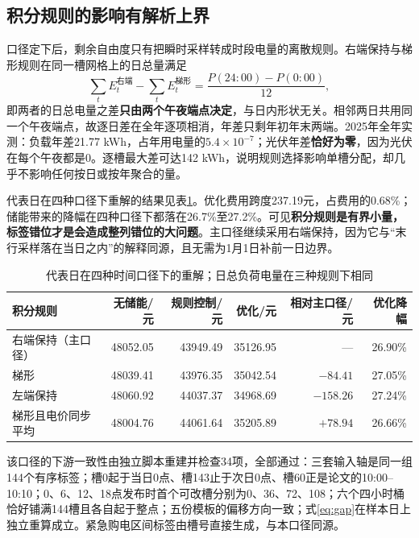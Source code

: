 \documentclass[UTF8,a4paper,zihao=-4,fontset=fandol]{ctexart}
\begin{document}
\subsection{积分规则的影响有解析上界}
口径定下后，剩余自由度只有把瞬时采样转成时段电量的离散规则。右端保持与梯形规则在同一槽网格上的日总量满足
\begin{equation}\label{eq:gap}
\sum_t E_t^{\text{右端}}-\sum_t E_t^{\text{梯形}}=\frac{P(24{:}00)-P(0{:}00)}{12},
\end{equation}
即两者的日总电量之差\textbf{只由两个午夜端点决定}，与日内形状无关。相邻两日共用同一个午夜端点，故逐日差在全年逐项相消，年差只剩年初年末两端。2025年全年实测：负载年差21.77 kWh，占年用电量的$5.4\times10^{-7}$；光伏年差\textbf{恰好为零}，因为光伏在每个午夜都是0。逐槽最大差可达142 kWh，说明规则选择影响单槽分配，却几乎不影响任何按日或按年聚合的量。

代表日在四种口径下重解的结果见表\ref{tab:time}。优化费用跨度237.19元，占费用的0.68\%；储能带来的降幅在四种口径下都落在26.7\%至27.2\%。可见\textbf{积分规则是有界小量，标签错位才是会造成整列错位的大问题}。主口径继续采用右端保持，因为它与“末行采样落在当日之内”的解释同源，且无需为1月1日补前一日边界。
\begin{table}[H]\centering\caption{代表日在四种时间口径下的重解；日总负荷电量在三种规则下相同}\label{tab:time}\small
\begin{tabular}{lrrrrr}\toprule
积分规则 & 无储能/元 & 规则控制/元 & 优化/元 & 相对主口径/元 & 优化降幅\\\midrule
右端保持（主口径） & 48052.05 & 43949.49 & 35126.95 & --- & 26.90\%\\
梯形 & 48039.41 & 43976.35 & 35042.54 & $-84.41$ & 27.05\%\\
左端保持 & 48060.92 & 44037.37 & 34968.69 & $-158.26$ & 27.24\%\\
梯形且电价同步平均 & 48004.76 & 44061.64 & 35205.89 & $+78.94$ & 26.66\%\\\bottomrule\end{tabular}
\end{table}
该口径的下游一致性由独立脚本重建并检查34项，全部通过：三套输入轴是同一组144个有序标签；槽0起于当日0点、槽143止于次日0点、槽60正是论文的10:00--10:10；0、6、12、18点发布时首个可改槽分别为0、36、72、108；六个四小时桶恰好铺满144槽且各自起于整点；五份模板的偏移方向一致；式\eqref{eq:gap}在样本日上独立重算成立。紧急购电区间标签由槽号直接生成，与本口径同源。
\end{document}

